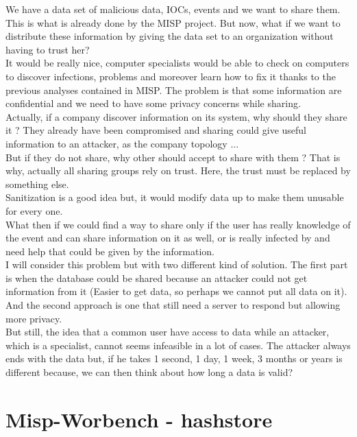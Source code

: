 \documentclass{eplmastersthesis}
\begin{document}
We have a data set of malicious data, IOCs, events and we want to share them. This is what is already done by the MISP project. But now, what if we want to distribute these information by giving the data set to an organization without having to trust her?\\
It would be really nice, computer specialists would be able to check on computers to discover infections, problems and moreover learn how to fix it thanks to the previous analyses contained in MISP. The problem is that some information are confidential and we need to have some privacy concerns while sharing. \\
Actually, if a company discover information on its system, why should they share it ? They already have been compromised and sharing could give useful information to an attacker, as the company topology ... \\
But if they do not share, why other should accept to share with them ? That is why, actually all sharing groups rely on trust. Here, the trust must be replaced by something else.\\
Sanitization is a good idea but, it would modify data up to make them unusable for every one.\\
What then if we could find a way to share only if the user has really knowledge of the event and can share information on it as well, or is really infected by and need help that could be given by the information.\\
I will consider this problem but with two different kind of solution. The first part is when the database could be shared because an attacker could not get information from it (Easier to get data, so perhaps we cannot put all data on it).\\
And the second approach is one that still need a server to respond but allowing more privacy.\\

But still, the idea that a common user have access to data while an attacker, which is a specialist, cannot seems infeasible in a lot of cases. The attacker always ends with the data but, if he takes 1 second, 1 day, 1 week, 3 months or years is different because, we can then think about how long a data is valid? \\



\section{Misp-Worbench - hashstore}
\end{document}

